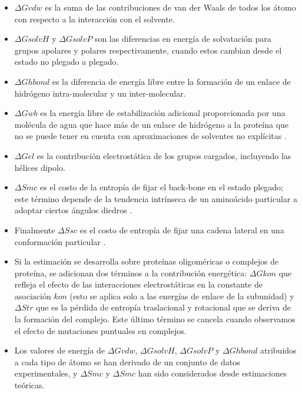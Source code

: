 \begin{itemize}
	
	\item $\Delta Gvdw$ es la suma de las contribuciones de van der Waals de todos los átomo con respecto a la interacción con el solvente.
	
	\item $\Delta GsolvH$ y $\Delta GsolvP$ son las diferencias en energía de solvatación para grupos apolares y polares respectivamente, cuando estos cambian desde el estado no plegado a plegado.
	
	\item $\Delta Ghbond$ es la diferencia de energía libre entre la formación de un enlace de hidrógeno intra-molecular y un inter-molecular.
	
	\item $\Delta Gwb$ es la energía libre de estabilización adicional proporcionada por una molécula de agua que hace más de un enlace de hidrógeno a la proteína que no se puede tener en cuenta con aproximaciones de solventes no explícitas \cite{petukhov1999local}. 
	
	\item $\Delta Gel$ es la contribución electrostática de los grupos cargados, incluyendo las hélices dipolo. 
	
	\item $\Delta Smc$ es el costo de la entropía de fijar el back-bone en el estado plegado; este término depende de la tendencia intrínseca de un aminoácido particular a adoptar ciertos ángulos diedros \cite{munoz1996local, munoz1995hydrophobic}. 
	
	\item Finalmente $\Delta Ssc$ es el costo de entropía de fijar una cadena lateral en una conformación particular \cite{abagyan1994biased}. 
	
	\item Si la estimación se desarrolla sobre proteínas oligoméricas o complejos de proteína, se adicionan dos términos a la contribución energética: $\Delta Gkon$ que refleja el efecto de las interacciones electrostáticas en la constante de asociación $kon$ (esto se aplica solo a las energías de enlace de la subunidad) \cite{vijayakumar1998electrostatic} y $\Delta Str$ que es la pérdida de entropía traslacional y rotacional que se deriva de la formación del complejo. Este último término se cancela cuando observamos el efecto de mutaciones puntuales en complejos. 
	
	\item Los valores de energía de $\Delta Gvdw$, $\Delta GsolvH$, $\Delta GsolvP$ y $\Delta Ghbond$ atribuidos a cada tipo de átomo se han derivado de un conjunto de datos experimentales, y $\Delta Smc$ y $\Delta Smc$ han sido considerados desde estimaciones teóricas. 
	

\end{itemize}
